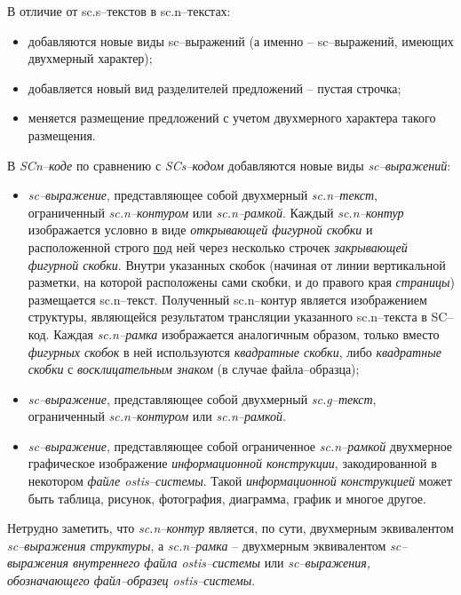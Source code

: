 В отличие от sc.s--текстов в sc.n--текстах:
\begin{itemize}
	\item добавляются новые виды sc--выражений (а именно -- sc--выражений, имеющих двухмерный характер);
	\item добавляется новый вид разделителей предложений -- пустая строчка;
	\item меняется размещение предложений с учетом двухмерного характера такого размещения.
\end{itemize}

В \textit{SCn--коде} по сравнению с \textit{SCs--кодом} добавляются новые виды \textit{sc--выражений}:
\begin{itemize}
	\item \textit{sc--выражение}, представляющее собой двухмерный \textit{\mbox{sc.n--текст}}, ограниченный \textit{sc.n--контуром} или \textit{sc.n--рамкой}. Каждый \textit{sc.n--контур} изображается условно в виде \textit{открывающей фигурной скобки} и расположенной строго \uline{под} ней через несколько строчек \textit{закрывающей фигурной скобки}. Внутри указанных скобок (начиная от линии вертикальной разметки, на которой расположены сами скобки, и до правого края \textit{страницы}) размещается sc.n--текст. Полученный sc.n--контур является изображением структуры, являющейся результатом трансляции указанного sc.n--текста в SC--код. Каждая \textit{sc.n--рамка} изображается аналогичным образом, только вместо \textit{фигурных скобок} в ней используются \textit{квадратные скобки}, либо \textit{квадратные скобки} с \textit{восклицательным знаком} (в случае файла--образца);
	\item \textit{sc--выражение}, представляющее собой двухмерный \textit{sc.g--текст}, ограниченный \textit{\mbox{sc.n--контуром}} или \textit{\mbox{sc.n--рамкой}}.
	\item \textit{sc--выражение}, представляющее собой ограниченное \textit{sc.n--рамкой} двухмерное графическое изображение \textit{информационной конструкции}, закодированной в некотором \textit{файле ostis--системы}. Такой \textit{информационной конструкцией} может быть таблица, рисунок, фотография, диаграмма, график и многое другое.
\end{itemize}

Нетрудно заметить, что \textit{sc.n--контур} является, по сути, двухмерным эквивалентом \textit{sc--выражения структуры}, а \textit{sc.n--рамка} -- двухмерным эквивалентом \textit{sc--выражения внутреннего файла \mbox{ostis--системы}} или \textit{sc--выражения, обозначающего файл--образец ostis--системы}.

